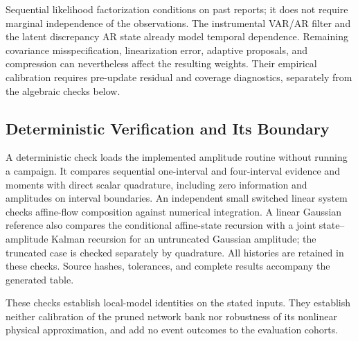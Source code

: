Sequential likelihood factorization conditions on past reports;
it does not require marginal independence of the observations. The
instrumental VAR/AR filter and the latent discrepancy AR state already
model temporal dependence. Remaining covariance misspecification,
linearization error, adaptive proposals, and compression can nevertheless
affect the resulting weights. Their empirical calibration requires
pre-update residual and coverage diagnostics, separately from the
algebraic checks below.

\subsection{Deterministic Verification and Its Boundary}
\label{app:math-verification}

A deterministic check loads the implemented amplitude routine without
running a campaign. It compares sequential one-interval
and four-interval evidence and moments with direct scalar quadrature,
including zero information and amplitudes on interval boundaries.
An independent small switched linear system checks affine-flow
composition against numerical integration. A linear Gaussian reference
also compares the conditional affine-state recursion with a joint
state--amplitude Kalman recursion for an untruncated Gaussian amplitude;
the truncated case is checked separately by quadrature. All histories are retained in these
checks. Source hashes, tolerances, and complete results accompany the
generated table.

These checks establish local-model identities on the stated inputs.
They establish neither calibration of the pruned network bank nor
robustness of its nonlinear physical approximation, and add no event
outcomes to the evaluation cohorts.
